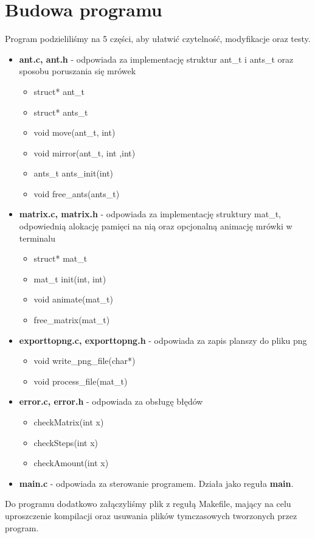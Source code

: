 \documentclass[a4paper,12pt]{article}
\begin{document}
\section{Budowa programu}
Program podzieliliśmy na 5 części, aby ułatwić czytelność, modyfikacje oraz testy.
\begin{itemize}
\item \textbf{ant.c, ant.h} - odpowiada za implementację struktur ant\_t i ants\_t oraz sposobu poruszania się mrówek 
\begin{itemize}
\item struct* ant\_t
\item struct* ants\_t
\item void move(ant\_t, int)
\item void mirror(ant\_t, int ,int)
\item ants\_t ants\_init(int)
\item void free\_ants(ants\_t)
\end{itemize}
\item \textbf{matrix.c, matrix.h} - odpowiada za implementację struktury mat\_t, odpowiednią alokację pamięci na nią oraz opcjonalną animację mrówki w terminalu
\begin{itemize}
\item struct* mat\_t
\item mat\_t init(int, int)
\item void animate(mat\_t)
\item free\_matrix(mat\_t)
\end{itemize}
\item \textbf{exporttopng.c, exporttopng.h} - odpowiada za zapis planszy do pliku png
\begin{itemize}
\item void write\_png\_file(char*)
\item void process\_file(mat\_t)
\end{itemize} 
\item \textbf{error.c, error.h} - odpowiada za obsługę błędów
\begin{itemize}
\item checkMatrix(int x)
\item checkSteps(int x)
\item checkAmount(int x)
\end{itemize}
\item \textbf{main.c} - odpowiada za sterowanie programem. Działa jako reguła \textbf{main}.
\end{itemize}
Do programu dodatkowo załączyliśmy plik z regułą Makefile, mający na celu uproszczenie kompilacji oraz usuwania plików tymczasowych tworzonych przez program.
\end{document}
